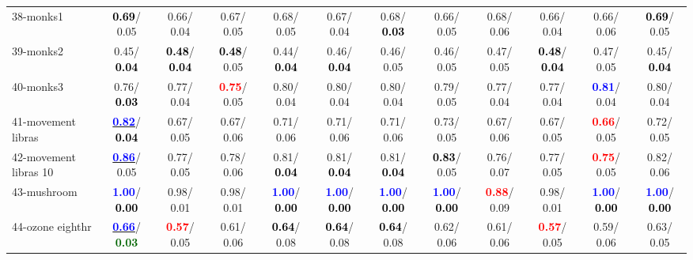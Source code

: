 \begin{table}[h]
\begin{center}
{\begin{tabular}{lc|c|c|c|c|c|c|c|c|c|c}
38-monks1 & \textcolor{black}{\textbf{  0.69}}/  0.05 &   0.66/  0.04 &   0.67/  0.05 &   0.68/  0.05 &   0.67/  0.04 &   0.68/\textcolor{black}{\textbf{  0.03}} &   0.66/  0.05 &   0.68/  0.06 &   0.66/  0.04 &   0.66/  0.06 & \textcolor{black}{\textbf{  0.69}}/  0.05 \\
39-monks2 &   0.45/\textcolor{black}{\textbf{  0.04}} & \textcolor{black}{\textbf{  0.48}}/\textcolor{black}{\textbf{  0.04}} & \textcolor{black}{\textbf{  0.48}}/  0.05 &   0.44/\textcolor{black}{\textbf{  0.04}} &   0.46/\textcolor{black}{\textbf{  0.04}} &   0.46/  0.05 &   0.46/  0.05 &   0.47/  0.05 & \textcolor{black}{\textbf{  0.48}}/\textcolor{black}{\textbf{  0.04}} &   0.47/  0.05 &   0.45/\textcolor{black}{\textbf{  0.04}} \\ \hline
40-monks3 &   0.76/\textcolor{black}{\textbf{  0.03}} &   0.77/  0.04 & \textcolor{red}{\textbf{  0.75}}/  0.05 &   0.80/  0.04 &   0.80/  0.04 &   0.80/  0.04 &   0.79/  0.05 &   0.77/  0.04 &   0.77/  0.04 & \textcolor{blue}{\textbf{  0.81}}/  0.04 &   0.80/  0.04 \\
41-movement libras & \underline{\textcolor{blue}{\textbf{  0.82}}}/\textcolor{black}{\textbf{  0.04}} &   0.67/  0.05 &   0.67/  0.06 &   0.71/  0.06 &   0.71/  0.06 &   0.71/  0.06 &   0.73/  0.05 &   0.67/  0.06 &   0.67/  0.05 & \textcolor{red}{\textbf{  0.66}}/  0.05 &   0.72/  0.05 \\
42-movement libras 10 & \underline{\textcolor{blue}{\textbf{  0.86}}}/  0.05 &   0.77/  0.05 &   0.78/  0.06 &   0.81/\textcolor{black}{\textbf{  0.04}} &   0.81/\textcolor{black}{\textbf{  0.04}} &   0.81/\textcolor{black}{\textbf{  0.04}} & \textcolor{black}{\textbf{  0.83}}/  0.05 &   0.76/  0.07 &   0.77/  0.05 & \textcolor{red}{\textbf{  0.75}}/  0.05 &   0.82/  0.06 \\
43-mushroom & \textcolor{blue}{\textbf{  1.00}}/\textcolor{black}{\textbf{  0.00}} &   0.98/  0.01 &   0.98/  0.01 & \textcolor{blue}{\textbf{  1.00}}/\textcolor{black}{\textbf{  0.00}} & \textcolor{blue}{\textbf{  1.00}}/\textcolor{black}{\textbf{  0.00}} & \textcolor{blue}{\textbf{  1.00}}/\textcolor{black}{\textbf{  0.00}} & \textcolor{blue}{\textbf{  1.00}}/\textcolor{black}{\textbf{  0.00}} & \textcolor{red}{\textbf{  0.88}}/  0.09 &   0.98/  0.01 & \textcolor{blue}{\textbf{  1.00}}/\textcolor{black}{\textbf{  0.00}} & \textcolor{blue}{\textbf{  1.00}}/\textcolor{black}{\textbf{  0.00}} \\
44-ozone eighthr & \underline{\textcolor{blue}{\textbf{  0.66}}}/\textcolor{darkgreen}{\textbf{  0.03}} & \textcolor{red}{\textbf{  0.57}}/  0.05 &   0.61/  0.06 & \textcolor{black}{\textbf{  0.64}}/  0.08 & \textcolor{black}{\textbf{  0.64}}/  0.08 & \textcolor{black}{\textbf{  0.64}}/  0.08 &   0.62/  0.06 &   0.61/  0.06 & \textcolor{red}{\textbf{  0.57}}/  0.05 &   0.59/  0.06 &   0.63/  0.05 \\

\end{tabular}}
\end{center}
\end{table}
